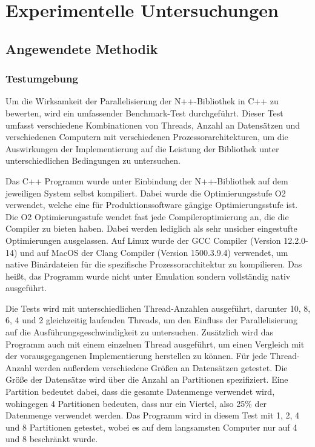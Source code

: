\chapter{Experimentelle Untersuchungen}
\label{ch:EntwickelteMethode}

\section{Angewendete Methodik}
\subsection{Testumgebung}

Um die Wirksamkeit der Parallelisierung der N++-Bibliothek in C++ zu bewerten, wird ein umfassender Benchmark-Test durchgeführt. Dieser Test umfasst verschiedene Kombinationen von Threads, Anzahl an Datensätzen und verschiedenen Computern mit verschiedenen Prozessorarchitekturen, um die Auswirkungen der Implementierung auf die Leistung der Bibliothek unter unterschiedlichen Bedingungen zu untersuchen.

Das C++ Programm wurde unter Einbindung der N++-Bibliothek auf dem jeweiligen System selbst kompiliert. Dabei wurde die Optimierungsstufe O2 verwendet, welche eine für Produktionssoftware gängige Optimierungsstufe ist. Die O2 Optimierungsstufe wendet fast jede Compileroptimierung an, die die Compiler zu bieten haben. Dabei werden lediglich als sehr unsicher eingestufte Optimierungen ausgelassen. Auf Linux wurde der GCC Compiler (Version 12.2.0-14) und auf MacOS der Clang Compiler (Version 1500.3.9.4) verwendet, um native Binärdateien für die spezifische Prozessorarchitektur zu kompilieren. Das heißt, das Programm wurde nicht unter Emulation sondern vollständig nativ ausgeführt.

Die Tests wird mit unterschiedlichen Thread-Anzahlen ausgeführt, darunter 10, 8, 6, 4 und 2 gleichzeitig laufenden Threads, um den Einfluss der Parallelisierung auf die Ausführungsgeschwindigkeit zu untersuchen. Zusätzlich wird das Programm auch mit einem einzelnen Thread ausgeführt, um einen Vergleich mit der vorausgegangenen Implementierung herstellen zu können. Für jede Thread-Anzahl werden außerdem verschiedene Größen an Datensätzen getestet. Die Größe der Datensätze wird über die Anzahl an Partitionen spezifiziert. Eine Partition bedeutet dabei, dass die gesamte Datenmenge verwendet wird, wohingegen 4 Partitionen bedeuten, dass nur ein Viertel, also 25\% der Datenmenge verwendet werden. Das Programm wird in diesem Test mit 1, 2, 4 und 8 Partitionen getestet, wobei es auf dem langsamsten Computer nur auf 4 und 8 beschränkt wurde.

